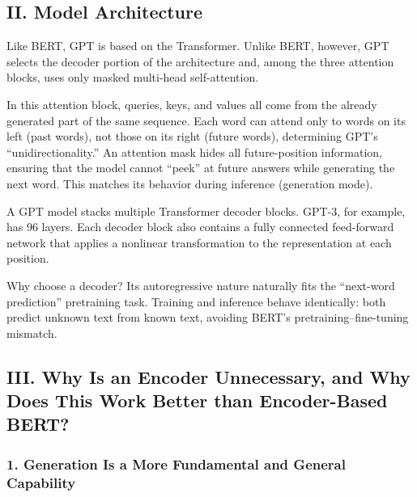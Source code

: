 \hypertarget{ii.-model-architecture}{%
\subsection{II. Model Architecture}\label{ii.-model-architecture}}

Like BERT, GPT is based on the Transformer. Unlike BERT, however, GPT selects the decoder portion of the architecture and, among the three attention blocks, uses only masked multi-head self-attention.

In this attention block, queries, keys, and values all come from the already generated part of the same sequence. Each word can attend only to words on its left (past words), not those on its right (future words), determining GPT's ``unidirectionality.'' An attention mask hides all future-position information, ensuring that the model cannot ``peek'' at future answers while generating the next word. This matches its behavior during inference (generation mode).

A GPT model stacks multiple Transformer decoder blocks. GPT-3, for example, has 96 layers. Each decoder block also contains a fully connected feed-forward network that applies a nonlinear transformation to the representation at each position.

Why choose a decoder? Its autoregressive nature naturally fits the ``next-word prediction'' pretraining task. Training and inference behave identically: both predict unknown text from known text, avoiding BERT's pretraining--fine-tuning mismatch.

\hypertarget{iii.-why-is-an-encoder-unnecessary-and-why-does-this-work-better-than-encoder-based-bert}{%
\subsection{III. Why Is an Encoder Unnecessary, and Why Does This Work Better than Encoder-Based BERT?}\label{iii.-why-is-an-encoder-unnecessary-and-why-does-this-work-better-than-encoder-based-bert}}

\hypertarget{generation-is-a-more-fundamental-and-general-capability}{%
\subsubsection{1. Generation Is a More Fundamental and General Capability}\label{generation-is-a-more-fundamental-and-general-capability}}

